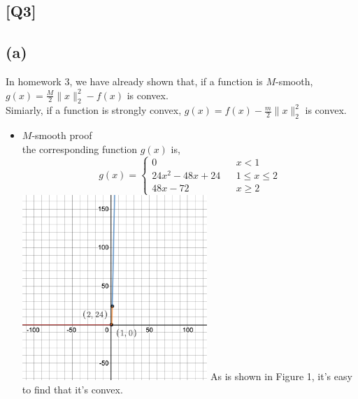 \documentclass[12pt, a4 paper]{article}
\begin{document}
    \begin{framed}
        \section{[Q3]}
        \subsection{(a)}
        In homework 3, we have already shown that, if a function
        is $M$-smooth, $g(x)=\frac{M}{2} \lVert x \rVert_{2}^{2}
        - f(x)$ is convex. \\
        \indent Simiarly, if a function is strongly
        convex, $g(x)=f(x)-\frac{m}{2}\lVert x\rVert_{2}^{2}$ is 
        convex.
        \begin{itemize}
            \item $M$-smooth proof\\
            \indent the corresponding function $g(x)$ is,
            $$ g(x)=\left\{
            \begin{array}{lcl}
            0       &      & {x      <      1}\\
            24x^{2}-48x+24     &      & {1 \leq x \leq 2}\\
            48x-72     &      & {x \geq 2}
            \end{array} \right. 
            $$
            {\centering
            \includegraphics[width=7cm, height=7cm]{3a1.png}
            }
            As is shown in Figure 1, it's easy to
            find that it's convex.


\end{itemize}
\end{framed}
\end{document}
